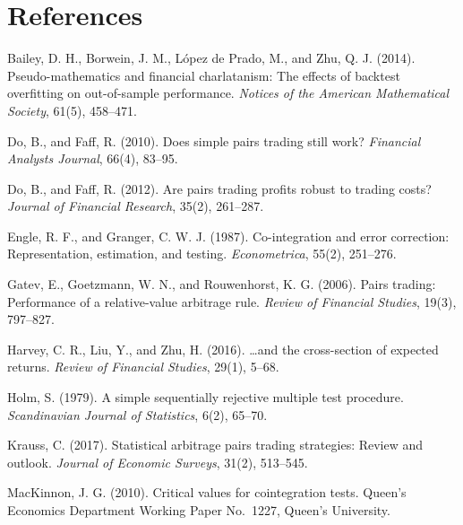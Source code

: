 \documentclass[11pt]{article}
\begin{document}
\hypertarget{references}{%
\section*{References}\label{references}}

\begin{list}{}{\setlength{\leftmargin}{1.5em}\setlength{\itemindent}{-1.5em}\setlength{\itemsep}{2pt}\setlength{\parsep}{0pt}}

\item Bailey, D. H., Borwein, J. M., López de Prado, M., and Zhu, Q. J. (2014).
Pseudo-mathematics and financial charlatanism: The effects of backtest
overfitting on out-of-sample performance. \emph{Notices of the American
Mathematical Society}, 61(5), 458--471.

\item Do, B., and Faff, R. (2010). Does simple pairs trading still work?
\emph{Financial Analysts Journal}, 66(4), 83--95.

\item Do, B., and Faff, R. (2012). Are pairs trading profits robust to trading
costs? \emph{Journal of Financial Research}, 35(2), 261--287.

\item Engle, R. F., and Granger, C. W. J. (1987). Co-integration and error
correction: Representation, estimation, and testing. \emph{Econometrica},
55(2), 251--276.

\item Gatev, E., Goetzmann, W. N., and Rouwenhorst, K. G. (2006). Pairs trading:
Performance of a relative-value arbitrage rule. \emph{Review of Financial
Studies}, 19(3), 797--827.

\item Harvey, C. R., Liu, Y., and Zhu, H. (2016). \ldots and the cross-section of
expected returns. \emph{Review of Financial Studies}, 29(1), 5--68.

\item Holm, S. (1979). A simple sequentially rejective multiple test procedure.
\emph{Scandinavian Journal of Statistics}, 6(2), 65--70.

\item Krauss, C. (2017). Statistical arbitrage pairs trading strategies: Review
and outlook. \emph{Journal of Economic Surveys}, 31(2), 513--545.

\item MacKinnon, J. G. (2010). Critical values for cointegration tests. Queen's
Economics Department Working Paper No.~1227, Queen's University.


\end{list}
\end{document}
